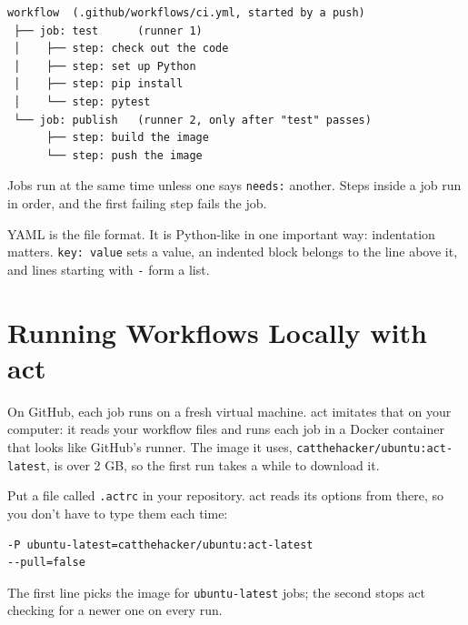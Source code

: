 \begin{codeblock}
\begin{Verbatim}[breaklines=false, fontsize=\fontsize{8.8}{8.68}\selectfont, fontfamily=diagrammono, formatcom=\diagramlines]
 workflow  (.github/workflows/ci.yml, started by a push)
 ├── job: test      (runner 1)
 │    ├── step: check out the code
 │    ├── step: set up Python
 │    ├── step: pip install
 │    └── step: pytest
 └── job: publish   (runner 2, only after "test" passes)
      ├── step: build the image
      └── step: push the image
\end{Verbatim}
\end{codeblock}

Jobs run at the same time unless one says \texttt{needs:} another. Steps inside a job run in order, and the first failing step fails the job.

YAML is the file format. It is Python-like in one important way: indentation matters. \texttt{key:\ value} sets a value, an indented block belongs to the line above it, and lines starting with \texttt{-} form a list.

\section{Running Workflows Locally with act}\label{06-your-first-pipeline:running-workflows-locally-with-act}

On GitHub, each job runs on a fresh virtual machine. act imitates that on your computer: it reads your workflow files and runs each job in a Docker container that looks like GitHub's runner. The image it uses, \texttt{catthehacker/}\allowbreak{}\texttt{ubuntu:}\allowbreak{}\texttt{act-}\allowbreak{}\texttt{latest}, is over 2 GB, so the first run takes a while to download it.


Put a file called \texttt{.actrc} in your repository. act reads its options from there, so you don't have to type them each time:

\begin{codeblock}
\begin{Verbatim}[formatcom=\outputstyle]
-P ubuntu-latest=catthehacker/ubuntu:act-latest
--pull=false
\end{Verbatim}
\end{codeblock}

The first line picks the image for \texttt{ubuntu-latest} jobs; the second stops act checking for a newer one on every run.

